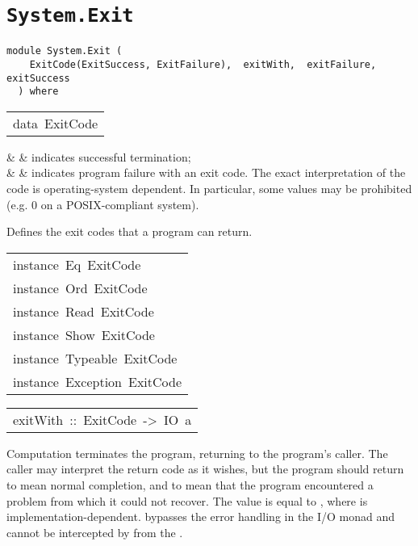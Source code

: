 \chapter{\texttt{System.Exit}}
\label{module:System.Exit}
\haddockbeginheader
{\haddockverb\begin{verbatim}
module System.Exit (
    ExitCode(ExitSuccess, ExitFailure),  exitWith,  exitFailure,  exitSuccess
  ) where\end{verbatim}}
\haddockendheader

\begin{haddockdesc}
\item[\begin{tabular}{@{}l}
data\ ExitCode
\end{tabular}]\haddockbegindoc
\haddockbeginconstrs
\haddockdecltt{=} &  & indicates successful termination;
 \\
\haddockdecltt{|} &  & indicates program failure with an exit code.
 The exact interpretation of the code is
 operating-system dependent.  In particular, some values
 may be prohibited (e.g. 0 on a POSIX-compliant system).
 \\
\haddockendconstrs\par
Defines the exit codes that a program can return.
\par

\end{haddockdesc}
\begin{haddockdesc}
\item[\begin{tabular}{@{}l}
instance\ Eq\ ExitCode\\instance\ Ord\ ExitCode\\instance\ Read\ ExitCode\\instance\ Show\ ExitCode\\instance\ Typeable\ ExitCode\\instance\ Exception\ ExitCode
\end{tabular}]
\end{haddockdesc}
\begin{haddockdesc}
\item[\begin{tabular}{@{}l}
exitWith\ ::\ ExitCode\ ->\ IO\ a
\end{tabular}]\haddockbegindoc
Computation  terminates the program, returning 
to the program's caller.  
The caller may interpret the return code as it wishes, but the program
should return  to mean normal completion, and
 to mean that the program encountered a problem from
which it could not recover.  The value  is equal to
, where  is
implementation-dependent.   bypasses the error handling in
the I/O monad and cannot be intercepted by  from the .
\par

\end{haddockdesc}

